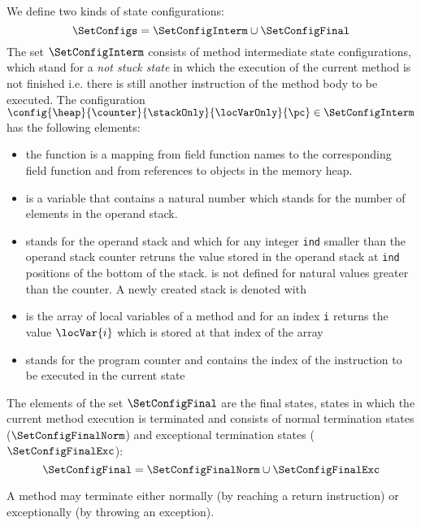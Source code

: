  We define two kinds of state configurations:
 $$\SetConfigs = \SetConfigInterm \cup \SetConfigFinal$$
 The set $\SetConfigInterm$ consists of method intermediate state configurations, which stand for a 
 \textit{not stuck state} in which the execution of the current method is not finished i.e.
 there is still another instruction of the method body to be executed.  
 The configuration $\config{\heap}{\counter}{ \stackOnly }{\locVarOnly}{\pc } \in \SetConfigInterm$ has the following elements:
               \begin{itemize}
                     \item the function \heap is a mapping from field function names to the corresponding field function and from 
		     references to objects in the memory heap.
	   
	             \item \counter is a variable that contains a natural number which stands for the number of
		     elements in the operand stack.  

		     \item \stackOnly  stands for the operand stack and which for any integer 
		     \texttt{ind} smaller than the operand stack counter \counter 
		     retruns the value   stored in the operand stack at \texttt{ind}
		     positions of the bottom of the stack. \stackOnly is not defined for natural values
		     greater than the counter. A newly created stack is denoted with \newStack
	     

	             \item \locVarOnly is the array of local variables of a method
		     and for an index \texttt{i} returns the value $\locVar{i}$ which is stored at that 
		     index of the array
	
	            \item \pc stands for the program counter and contains the index of the instruction to be executed in the current state
	        \end{itemize}


 The elements of the set $\SetConfigFinal$ are the final states, states in which the current method execution is terminated and consists of 
 normal termination states ($\SetConfigFinalNorm$) and exceptional termination states ($\SetConfigFinalExc$):
 $$\SetConfigFinal =  \SetConfigFinalNorm   \cup \SetConfigFinalExc $$ 
 
 A method may terminate either normally (by reaching a return instruction) or exceptionally (by throwing an exception).
 
